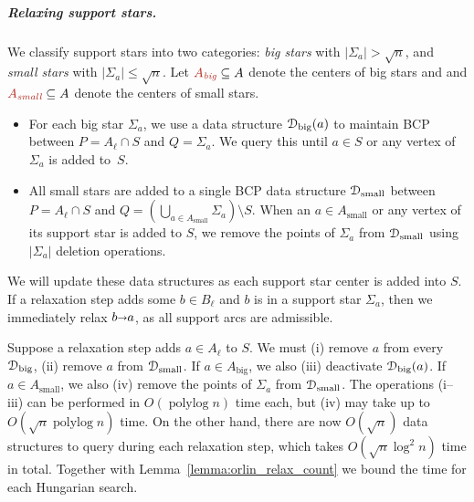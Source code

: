 \documentclass[a4paper,UKenglish]{socg-lipics-v2018}
\def\polylog{\mathop{\mathrm{polylog}}}
\def\abs#1{\mathopen| #1 \mathclose|}		%
\def\arcto{\mathord\shortrightarrow}
\def\arc#1#2{#1\arcto#2}
\theoremstyle{plain}
\numberwithin{figure}{section}
\renewcommand{\paragraph}{\subparagraph}
\def\EMPH#1{\textcolor{BrickRed}{{\emph{#1}}}}
\begin{document}
\paragraph{Relaxing support stars.}
We classify support stars into two categories: \EMPH{big stars} with
$\abs{\Sigma_a} > \sqrt{n}$, and \EMPH{small stars} with
$\abs{\Sigma_a} \leq \sqrt{n}$.
Let $\EMPH{$A_\text{big}$} \subseteq A$ denote the centers of big stars and
and $\EMPH{$A_\text{small}$} \subseteq A$ denote the centers of small stars.
\begin{itemize}
\item For each big star $\Sigma_a$, we use a data structure
	\EMPH{$\EuScript{D}_\text{big}(a)$} to maintain BCP between
	$P = A_\ell \cap S$ and $Q = \Sigma_a$.
	We query this until $a \in S$ or any vertex of $\Sigma_a$ is added to~$S$.
\item All small stars are added to a single BCP data structure
	\EMPH{$\EuScript{D}_\text{small}$} between $P = A_\ell \cap S$ and
	$Q = (\bigcup_{a \in A_\text{small}} \Sigma_a) \setminus S$.
	When an $a \in A_\text{small}$ or any vertex of its support star is
	added to $S$, we remove the points of $\Sigma_a$ from
	$\EuScript{D}_\text{small}$ using $\abs{\Sigma_a}$ deletion operations.
\end{itemize}
We will update these data structures as each support star center is added into
$S$.
If a relaxation step adds some $b \in B_\ell$ and $b$ is in a support star
$\Sigma_a$, then we immediately relax $\arc ba$, as all support arcs are
admissible.

Suppose a relaxation step adds $a \in A_\ell$ to $S$.
We must
(i) remove $a$ from every $\EuScript{D}_\text{big}$,
(ii) remove $a$ from $\EuScript{D}_\text{small}$.
If $a \in A_\text{big}$, we also (iii) deactivate $\EuScript{D}_\text{big}(a)$.
If $a \in  A_\text{small}$, we also (iv) remove the points of $\Sigma_a$ from
$\EuScript{D}_\text{small}$.
The operations (i--iii) can be performed in $O(\polylog n)$ time
each, but (iv) may take up to $O(\sqrt{n}\polylog n)$ time.
%
On the other hand, there are now $O(\sqrt{n})$ data structures to query during
each relaxation step, which takes $O(\sqrt{n}\log^2 n)$ time in total.
%
Together with Lemma~\ref{lemma:orlin_relax_count} we bound the time for each Hungarian search.
\end{document}
